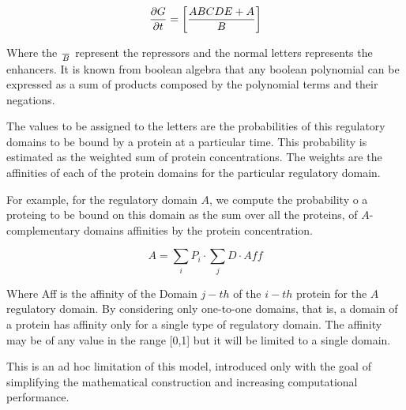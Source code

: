 \begin{equation}
\frac{\partial{G}}{\partial t} = \left[ ABCDE + A\over{B} \right]
\end{equation}

Where the $\over{B}$ represent the repressors and the normal letters represents
the enhancers. It is known from boolean algebra that any boolean polynomial can
be expressed as a sum of products composed by the polynomial terms and their
negations.

The values to be assigned to the letters are the probabilities of this
regulatory domains to be bound by a protein at a particular time. This probability
is estimated as the weighted sum of protein concentrations. The weights are the
affinities of each of the protein domains for the particular regulatory domain.

For example, for the regulatory domain $A$, we compute the probability o a
proteing to be bound on this domain as the sum over all the proteins, of
$A$-complementary domains affinities by the protein concentration.


\begin{equation}
A = \sum_i P_i \cdot \sum_j D  \cdot Aff
\end{equation}

Where Aff is the affinity of the Domain $j-th$ of the $i-th$ protein for the
$A$ regulatory domain. By considering only one-to-one domains, that is, a domain
of a protein has affinity only for a single type of regulatory domain. The affinity
may be of any value in the range [0,1] but it will be limited to a single domain.

This is an ad hoc limitation of this model, introduced only with the goal of simplifying
the mathematical construction and increasing computational performance.





